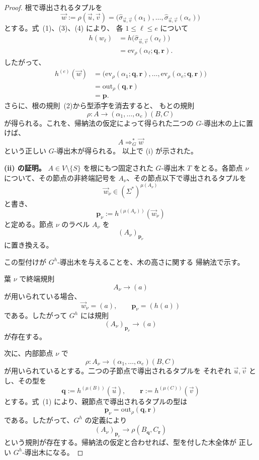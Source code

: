 \documentclass[11pt,a4paper]{ltjsarticle}
\theoremstyle{remark}
\newcommand{\out}{\mathrm{out}}
\newcommand{\ev}{\mathrm{ev}}
\newcommand{\tuple}[1]{\vec{#1}}
\begin{document}
\begin{proof}
根で導出されるタプルを
\[
  \tuple w
  :=
  \rho(\tuple u,\tuple v)
  =
  \bigl(
    \widehat{\sigma}_{\tuple u,\tuple v}(\alpha_1),
    \ldots,
    \widehat{\sigma}_{\tuple u,\tuple v}(\alpha_e)
  \bigr)
\]
とする。式~\textup{(1)}、\textup{(3)}、\textup{(4)} により、
各 \(1\le\ell\le e\) について
\[
\begin{aligned}
  h(w_\ell)
  &=
  h\bigl(
    \widehat{\sigma}_{\tuple u,\tuple v}(\alpha_\ell)
  \bigr)
  \\
  &=
  \ev_\rho(\alpha_\ell;\mathbf q,\mathbf r).
\end{aligned}
\]
したがって、
\[
\begin{aligned}
  h^{(e)}(\tuple w)
  &=
  \bigl(
    \ev_\rho(\alpha_1;\mathbf q,\mathbf r),
    \ldots,
    \ev_\rho(\alpha_e;\mathbf q,\mathbf r)
  \bigr)
  \\
  &=
  \out_\rho(\mathbf q,\mathbf r)
  \\
  &=
  \mathbf p.
\end{aligned}
\]
さらに、根の規則~\textup{(2)}から型添字を消去すると、
もとの規則
\[
  \rho\colon
  A\to(\alpha_1,\ldots,\alpha_e)(B,C)
\]
が得られる。これを、帰納法の仮定によって得られた二つの
\(G\)-導出木の上に置けば、
\[
  A\Rightarrow_G^*\tuple w
\]
という正しい \(G\)-導出木が得られる。
以上で (i) が示された。

\medskip
\noindent
\textbf{(ii) の証明。}
\(A\in V\setminus\{S\}\) を根にもつ固定された \(G\)-導出木
\(T\) をとる。各節点 \(\nu\) について、その節点の非終端記号を
\(A_\nu\)、その節点以下で導出されるタプルを
\[
  \tuple w_\nu
  \in(\Sigma^*)^{\mu(A_\nu)}
\]
と書き、
\[
  \mathbf p_\nu
  :=
  h^{(\mu(A_\nu))}(\tuple w_\nu)
  \]
と定める。節点 \(\nu\) のラベル \(A_\nu\) を
\[
  (A_\nu)_{\mathbf p_\nu}
\]
に置き換える。

この型付けが \(G^h\)-導出木を与えることを、木の高さに関する
帰納法で示す。

葉 \(\nu\) で終端規則
\[
  A_\nu\to(a)
\]
が用いられている場合、
\[
  \tuple w_\nu=(a),
  \qquad
  \mathbf p_\nu=(h(a))
\]
である。したがって \(G^h\) には規則
\[
  (A_\nu)_{\mathbf p_\nu}\to(a)
\]
が存在する。

次に、内部節点 \(\nu\) で
\[
  \rho\colon
  A_\nu\to
  (\alpha_1,\ldots,\alpha_e)(B,C)
\]
が用いられているとする。二つの子節点で導出されるタプルを
それぞれ \(\tuple u,\tuple v\) とし、その型を
\[
  \mathbf q:=h^{(\mu(B))}(\tuple u),
  \qquad
  \mathbf r:=h^{(\mu(C))}(\tuple v)
\]
とする。式~\textup{(1)} により、親節点で導出されるタプルの型は
\[
  \mathbf p_\nu
  =
  \out_\rho(\mathbf q,\mathbf r)
\]
である。したがって、\(G^h\) の定義により
\[
  (A_\nu)_{\mathbf p_\nu}
  \to
  \rho(B_{\mathbf q},C_{\mathbf r})
\]
という規則が存在する。帰納法の仮定と合わせれば、型を付した木全体が
正しい \(G^h\)-導出木になる。


\end{proof}
\end{document}
